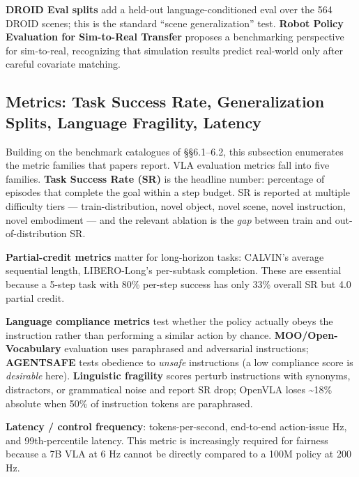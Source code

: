 \documentclass{article}
\begin{document}
\textbf{DROID Eval splits} \cite{khazatsky2024droidalargescalein} add a held-out language-conditioned eval over the 564 DROID scenes; this is the standard ``scene generalization'' test. \textbf{Robot Policy Evaluation for Sim-to-Real Transfer} \cite{yang2025robotpolicyevaluat} proposes a benchmarking perspective for sim-to-real, recognizing that simulation results predict real-world only after careful covariate matching.

\subsection{Metrics: Task Success Rate, Generalization Splits, Language Fragility, Latency}\label{metrics-task-success-rate-generalization-splits-language-fragility-latency}

Building on the benchmark catalogues of §§6.1--6.2, this subsection enumerates the metric families that papers report. VLA evaluation metrics fall into five families. \textbf{Task Success Rate (SR)} is the headline number: percentage of episodes that complete the goal within a step budget. SR is reported at multiple difficulty tiers --- train-distribution, novel object, novel scene, novel instruction, novel embodiment --- and the relevant ablation is the \emph{gap} between train and out-of-distribution SR.

\textbf{Partial-credit metrics} matter for long-horizon tasks: CALVIN's average sequential length, LIBERO-Long's per-subtask completion. These are essential because a 5-step task with 80\% per-step success has only 33\% overall SR but 4.0 partial credit.

\textbf{Language compliance metrics} test whether the policy actually obeys the instruction rather than performing a similar action by chance. \textbf{MOO/Open-Vocabulary} evaluation uses paraphrased and adversarial instructions; \textbf{AGENTSAFE} \cite{ying2025agentsafebenchmark} tests obedience to \emph{unsafe} instructions (a low compliance score is \emph{desirable} here). \textbf{Linguistic fragility} scores \cite{tong2026uncoveringlinguist} perturb instructions with synonyms, distractors, or grammatical noise and report SR drop; OpenVLA loses \textasciitilde18\% absolute when 50\% of instruction tokens are paraphrased.

\textbf{Latency / control frequency}: tokens-per-second, end-to-end action-issue Hz, and 99th-percentile latency. This metric is increasingly required for fairness because a 7B VLA at 6 Hz cannot be directly compared to a 100M policy at 200 Hz.
\end{document}

